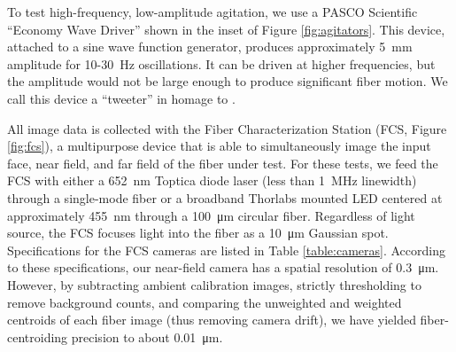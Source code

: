 To test high-frequency, low-amplitude agitation, we use a PASCO Scientific ``Economy Wave Driver'' shown in the inset of Figure \ref{fig:agitators}. This device, attached to a sine wave function generator, produces approximately \SI{5}{\milli\meter} amplitude for 10-\SI{30}{\hertz} oscillations. It can be driven at higher frequencies, but the amplitude would not be large enough to produce significant fiber motion. We call this device a ``tweeter'' in homage to \citet{plavchan_precision_2013}.

All image data is collected with the Fiber Characterization Station (FCS, Figure \ref{fig:fcs}), a multipurpose device that is able to simultaneously image the input face, near field, and far field of the fiber under test. For these tests, we feed the FCS with either a \SI{652}{\nano\meter} Toptica diode laser (less than \SI{1}{\mega\hertz} linewidth) through a single-mode fiber or a broadband Thorlabs mounted LED centered at approximately \SI{455}{\nano\meter} through a \SI{100}{\micro\meter} circular fiber. Regardless of light source, the FCS focuses light into the fiber as a \SI{10}{\micro\meter} Gaussian spot. Specifications for the FCS cameras are listed in Table \ref{table:cameras}. According to these specifications, our near-field camera has a spatial resolution of \SI{0.3}{\micro\meter}. However, by subtracting ambient calibration images, strictly thresholding to remove background counts, and comparing the unweighted and weighted centroids of each fiber image (thus removing camera drift), we have yielded fiber-centroiding precision to about \SI{0.01}{\micro\meter}.

